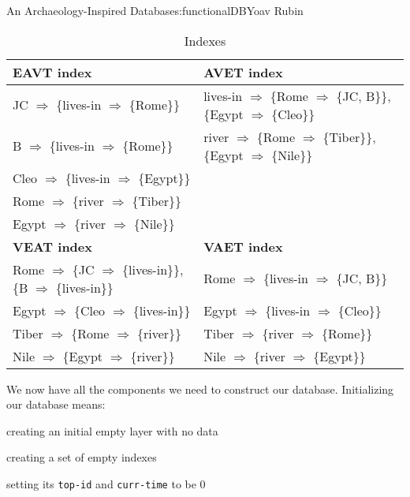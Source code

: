 \begin{aosachapter}{An Archaeology-Inspired Database}{s:functionalDB}{Yoav Rubin}
\begin{table}
\centering
{\footnotesize
{}
\begin{tabular}{ll}
\hline
\textbf{EAVT index}
& \textbf{AVET index}
\\
\hline
JC $\Rightarrow$ \{lives-in $\Rightarrow$ \{Rome\}\} & lives-in $\Rightarrow$ \{Rome $\Rightarrow$ \{JC, B\}\}, \{Egypt $\Rightarrow$ \{Cleo\}\} \\
B $\Rightarrow$ \{lives-in $\Rightarrow$ \{Rome\}\}  & river $\Rightarrow$ \{Rome $\Rightarrow$ \{Tiber\}\}, \{Egypt $\Rightarrow$ \{Nile\}\} \\
Cleo $\Rightarrow$ \{lives-in $\Rightarrow$ \{Egypt\}\} & \\ 
Rome $\Rightarrow$ \{river $\Rightarrow$ \{Tiber\}\}  & \\ 
Egypt $\Rightarrow$ \{river $\Rightarrow$ \{Nile\}\}  & \\
\hline
\textbf{VEAT index}
& \textbf{VAET index}
\\
\hline
Rome $\Rightarrow$ \{JC $\Rightarrow$ \{lives-in\}\}, \{B $\Rightarrow$ \{lives-in\}\} & Rome $\Rightarrow$ \{lives-in $\Rightarrow$ \{JC, B\}\} \\
Egypt $\Rightarrow$ \{Cleo $\Rightarrow$ \{lives-in\}\}                                & Egypt $\Rightarrow$ \{lives-in $\Rightarrow$ \{Cleo\}\} \\ 
Tiber $\Rightarrow$ \{Rome $\Rightarrow$ \{river\}\}                                   & Tiber $\Rightarrow$ \{river $\Rightarrow$ \{Rome\}\} \\
Nile $\Rightarrow$ \{Egypt $\Rightarrow$ \{river\}\}                                   & Nile $\Rightarrow$ \{river $\Rightarrow$ \{Egypt\}\} \\
\hline
\end{tabular}
}
\caption{Indexes}
\label{500l.functionaldb.indextable}
\end{table}

\label{database}

We now have all the components we need to construct our database.
Initializing our database means:

\begin{aosaitemize}

\item
  creating an initial empty layer with no data
\item
  creating a set of empty indexes
\item
  setting its \texttt{top-id} and \texttt{curr-time} to be 0
\end{aosaitemize}


\end{aosachapter}
